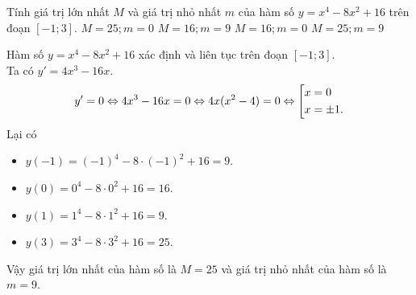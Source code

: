 \begin{ex}%
 Tính giá trị lớn nhất $M$ và giá trị nhỏ nhất $m$ của hàm số $y = x^4 - 8x^2 + 16$ trên đoạn $[-1;3]$.
 \choice
  {$M = 25 ; m = 0$}
  {$M = 16 ; m = 9$}
  {$M = 16 ; m = 0$}
  {\True $M = 25 ; m = 9$}
 \loigiai
  {
  Hàm số $y = x^4 - 8x^2 + 16$ xác định và liên tục trên đoạn $[-1;3]$.\\
  Ta có $y' = 4x^3 - 16x$.
  \begin{eqnarray*}
   y' = 0 \Leftrightarrow 4x^3 - 16x = 0 \Leftrightarrow 4x(x^2 - 4) = 0 \Leftrightarrow \left[\begin{aligned}& x = 0 \\& x = \pm 1.\end{aligned}\right.
  \end{eqnarray*}
  Lại có
  \begin{itemize}
   \item $y(-1) = (-1)^4 - 8 \cdot (-1)^2 + 16 = 9$.
   \item $y(0)  = 0^4 - 8 \cdot 0^2 + 16 = 16$.
   \item $y(1)  = 1^4 - 8 \cdot 1^2 + 16 = 9$.
   \item $y(3)  = 3^4 - 8 \cdot 3^2 + 16 = 25$.
  \end{itemize}
  Vậy giá trị lớn nhất của hàm số là $M = 25$ và giá trị nhỏ nhất của hàm số là $m = 9$.
  }
\end{ex}

